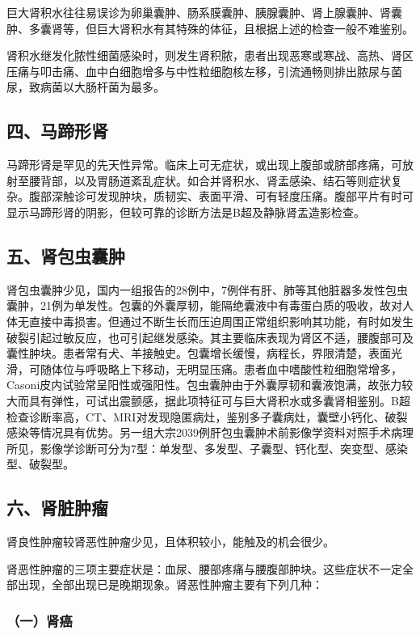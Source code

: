巨大肾积水往往易误诊为卵巢囊肿、肠系膜囊肿、胰腺囊肿、肾上腺囊肿、肾囊肿、多囊肾等，但巨大肾积水有其特殊的体征，且根据上述的检查一般不难鉴别。

肾积水继发化脓性细菌感染时，则发生肾积脓，患者出现恶寒或寒战、高热、肾区压痛与叩击痛、血中白细胞增多与中性粒细胞核左移，引流通畅则排出脓尿与菌尿，致病菌以大肠杆菌为最多。

\subsection{四、马蹄形肾}

马蹄形肾是罕见的先天性异常。临床上可无症状，或出现上腹部或脐部疼痛，可放射至腰背部，以及胃肠道紊乱症状。如合并肾积水、肾盂感染、结石等则症状复杂。腹部深触诊可发现肿块，质韧实、表面平滑、可有轻度压痛。腹部平片有时可显示马蹄形肾的阴影，但较可靠的诊断方法是B超及静脉肾盂造影检查。

\subsection{五、肾包虫囊肿}

肾包虫囊肿少见，国内一组报告的28例中，7例伴有肝、肺等其他脏器多发性包虫囊肿，21例为单发性。包囊的外囊厚韧，能隔绝囊液中有毒蛋白质的吸收，故对人体无直接中毒损害。但通过不断生长而压迫周围正常组织影响其功能，有时如发生破裂引起过敏反应，也可引起继发感染。其主要临床表现为肾区不适，腰腹部可及囊性肿块。患者常有犬、羊接触史。包囊增长缓慢，病程长，界限清楚，表面光滑，可随体位与呼吸略上下移动，无明显压痛。患者血中嗜酸性粒细胞常增多，Casoni皮内试验常呈阳性或强阳性。包虫囊肿由于外囊厚韧和囊液饱满，故张力较大而具有弹性，可试出震颤感，据此项特征可与巨大肾积水或多囊肾相鉴别。B超检查诊断率高，CT、MRI对发现隐匿病灶，鉴别多子囊病灶，囊壁小钙化、破裂感染等情况具有优势。另一组大宗2039例肝包虫囊肿术前影像学资料对照手术病理所见，影像学诊断可分为7型：单发型、多发型、子囊型、钙化型、突变型、感染型、破裂型。

\subsection{六、肾脏肿瘤}

肾良性肿瘤较肾恶性肿瘤少见，且体积较小，能触及的机会很少。

肾恶性肿瘤的三项主要症状是：血尿、腰部疼痛与腰腹部肿块。这些症状不一定全部出现，全部出现已是晚期现象。肾恶性肿瘤主要有下列几种：

\subsubsection{（一）肾癌}

